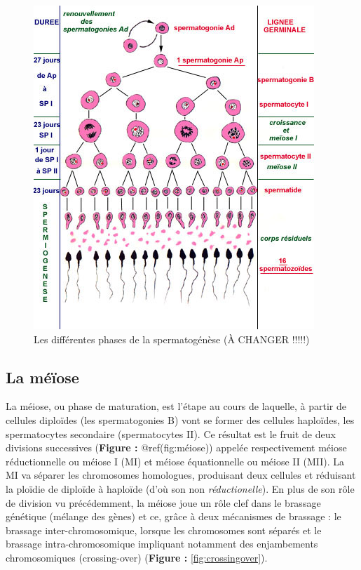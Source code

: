 \documentclass[12pt,twoside]{reedthesis}
\theoremstyle{definition}
\theoremstyle{definition}
\theoremstyle{remark}
\begin{document}
  \begin{figure}
  
  {\centering \includegraphics[scale=0.75]{figure/spermatogenese} 
  
  }
  
  \caption{Les différentes phases de la spermatogénèse (À CHANGER !!!!!)}\label{fig:spermatogenese}
  \end{figure}
  
  \subsection{La méïose}\label{la-meiose}
  
  La méiose, ou phase de maturation, est l'étape au cours de laquelle, à
  partir de cellules diploïdes (les spermatogonies B) vont se former des
  cellules haploïdes, les spermatocytes secondaire (spermatocytes II). Ce
  résultat est le fruit de deux divisions successives (\textbf{Figure :
  }@ref(fig:méiose)) appelée respectivement méiose réductionnelle ou
  méiose I (MI) et méiose équationnelle ou méiose II (MII). La MI va
  séparer les chromosomes homologues, produisant deux cellules et
  réduisant la ploïdie de diploïde à haploïde (d'où son non
  \emph{réductionelle}). En plus de son rôle de division vu précédemment,
  la méiose joue un rôle clef dans le brassage génétique (mélange des
  gènes) et ce, grâce à deux mécanismes de brassage : le brassage
  inter-chromosomique, lorsque les chromosomes sont séparés et le brassage
  intra-chromosomique impliquant notamment des enjambements chromosomiques
  (crossing-over) (\textbf{Figure : }\ref{fig:crossingover}).
  
\end{document}
